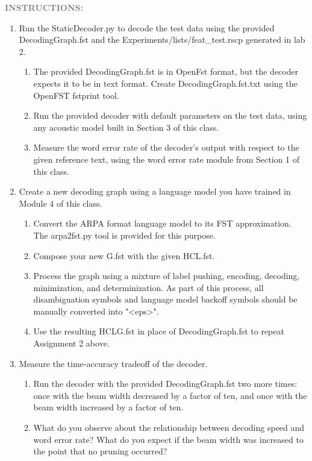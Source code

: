 {{\bf \textcolor{gray}{INSTRUCTIONS:}}
\begin{enumerate}
  \item Run the StaticDecoder.py to decode the test data using the provided DecodingGraph.fst and the Experiments/lists/feat\_test.rscp generated in lab 2.
    \begin{enumerate}
      \item The provided DecodingGraph.fst is in OpenFst format, but the decoder expects it to be in text format. Create DecodingGraph.fst.txt using the OpenFST fstprint tool.
      \item Run the provided decoder with default parameters on the test data, using any acoustic model built in Section 3 of this class.
      \item Measure the word error rate of the decoder's output with respect to the given reference text, using the word error rate module from Section 1 of this class.
    \end{enumerate}
  \item Create a new decoding graph using a language model you have trained in Module 4 of this class.
    \begin{enumerate}
      \item Convert the ARPA format language model to its FST approximation. The arpa2fst.py tool is provided for this purpose.
      \item Compose your new G.fst with the given HCL.fst.
      \item Process the graph using a mixture of label pushing, encoding, decoding, minimization, and determinization. As part of this process, all disambiguation symbols and language model backoff symbols should be manually converted into "<eps>".
      \item Use the resulting HCLG.fst in place of DecodingGraph.fst to repeat Assignment 2 above.
    \end{enumerate}
  \item Measure the time-accuracy tradeoff of the decoder.
    \begin{enumerate}
      \item Run the decoder with the provided DecodingGraph.fst two more times: once with the beam width decreased by a factor of ten, and once with the beam width increased by a factor of ten.
      \item What do you observe about the relationship between decoding speed and word error rate? What do you expect if the beam width was increased to the point that no pruning occurred?
    \end{enumerate}
\end{enumerate}

}

